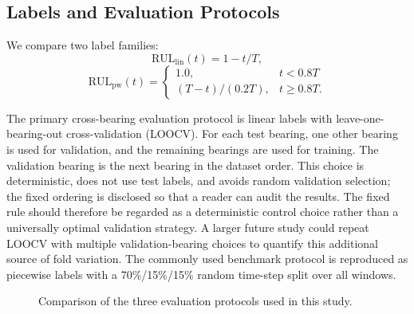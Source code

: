 \documentclass[pdflatex,sn-mathphys-num]{sn-jnl}
\begin{document}
\subsection{Labels and Evaluation Protocols}
We compare two label families:
\begin{equation}
\text{RUL}_{\text{lin}}(t) = 1 - t/T,
\label{eq:linear}
\end{equation}
\begin{equation}
\text{RUL}_{\text{pw}}(t) =
\begin{cases}
1.0, & t < 0.8T \\
(T - t)/(0.2T), & t \geq 0.8T.
\end{cases}
\label{eq:piecewise}
\end{equation}

The primary cross-bearing evaluation protocol is linear labels with leave-one-bearing-out cross-validation (LOOCV). For each test bearing, one other bearing is used for validation, and the remaining bearings are used for training. The validation bearing is the next bearing in the dataset order. This choice is deterministic, does not use test labels, and avoids random validation selection; the fixed ordering is disclosed so that a reader can audit the results. The fixed rule should therefore be regarded as a deterministic control choice rather than a universally optimal validation strategy. A larger future study could repeat LOOCV with multiple validation-bearing choices to quantify this additional source of fold variation. The commonly used benchmark protocol is reproduced as piecewise labels with a 70\%/15\%/15\% random time-step split over all windows.

\begin{figure}[t]
\centering
{}
\caption{Comparison of the three evaluation protocols used in this study.}
\label{fig:protocols}
\end{figure}
\end{document}
